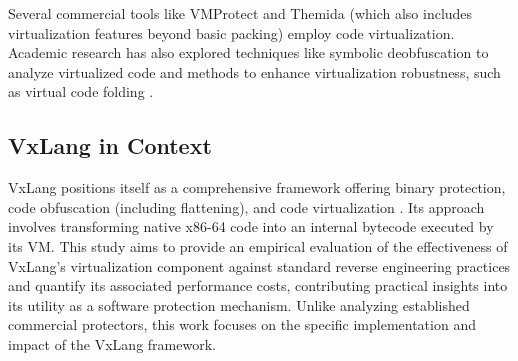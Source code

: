 Several commercial tools like VMProtect \cite{VMP24} and Themida \cite{Ore24} (which also includes virtualization features beyond basic packing) employ code virtualization. Academic research has also explored techniques like symbolic deobfuscation to analyze virtualized code \cite{Sal18} and methods to enhance virtualization robustness, such as virtual code folding \cite{Don20}.

\subsection{VxLang in Context}
VxLang positions itself as a comprehensive framework offering binary protection, code obfuscation (including flattening), and code virtualization \cite{VxLang}. Its approach involves transforming native x86-64 code into an internal bytecode executed by its VM. This study aims to provide an empirical evaluation of the effectiveness of VxLang's virtualization component against standard reverse engineering practices and quantify its associated performance costs, contributing practical insights into its utility as a software protection mechanism. Unlike analyzing established commercial protectors, this work focuses on the specific implementation and impact of the VxLang framework.
